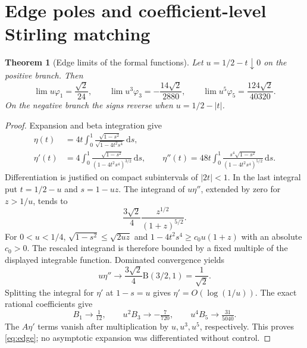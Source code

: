 \documentclass[10pt]{article}
\newtheorem{theorem}[proposition]{Theorem}
\newcommand{\dd}{\mathrm d}
\newcommand{\ph}{\varphi}
\begin{document}
\section{Edge poles and coefficient-level Stirling matching}
\begin{theorem}[Edge limits of the formal functions]
Let $u=1/2-t\downarrow0$ on the positive branch. Then
\begin{equation}
 \lim u\ph_1=\frac{\sqrt2}{24},\qquad
 \lim u^3\ph_3=-\frac{14\sqrt2}{2880},\qquad
 \lim u^5\ph_5=\frac{124\sqrt2}{40320}.
 \label{eq:edge}
\end{equation}
On the negative branch the signs reverse when $u=1/2-|t|$.
\end{theorem}
\begin{proof}
Expansion and beta integration give
\begin{align}
 \eta(t)&=4t\int_0^1\frac{\sqrt{1-s^2}}{\sqrt{1-4t^2s^4}}\,\dd s,\nonumber\\
 \eta'(t)&=4\int_0^1\frac{\sqrt{1-s^2}}{(1-4t^2s^4)^{3/2}}\,\dd s,\qquad
 \eta''(t)=48t\int_0^1\frac{s^4\sqrt{1-s^2}}{(1-4t^2s^4)^{5/2}}\,\dd s.
 \label{eq:etaint}
\end{align}
Differentiation is justified on compact subintervals of $|2t|<1$. In the last integral put $t=1/2-u$ and $s=1-uz$. The integrand of $u\eta''$, extended by zero for $z>1/u$, tends to
\[
 \frac{3\sqrt2}{4}\frac{z^{1/2}}{(1+z)^{5/2}}.
\]
For $0<u<1/4$, $\sqrt{1-s^2}\le\sqrt{2uz}$ and
$1-4t^2s^4\ge c_0u(1+z)$ with an absolute $c_0>0$. The rescaled integrand is therefore bounded by a fixed multiple of the displayed integrable function. Dominated convergence yields
\[
 u\eta''\longrightarrow\frac{3\sqrt2}{4}\mathrm B(3/2,1)=\frac1{\sqrt2}.
\]
Splitting the integral for $\eta'$ at $1-s=u$ gives $\eta'=O(\log(1/u))$. The exact rational coefficients give
\[
 B_1\to\tfrac1{12},\qquad u^2B_3\to-\tfrac7{720},\qquad
 u^4B_5\to\tfrac{31}{5040}.
\]
The $A\eta'$ terms vanish after multiplication by $u,u^3,u^5$, respectively. This proves \eqref{eq:edge}; no asymptotic expansion was differentiated without control.
\end{proof}
\end{document}
